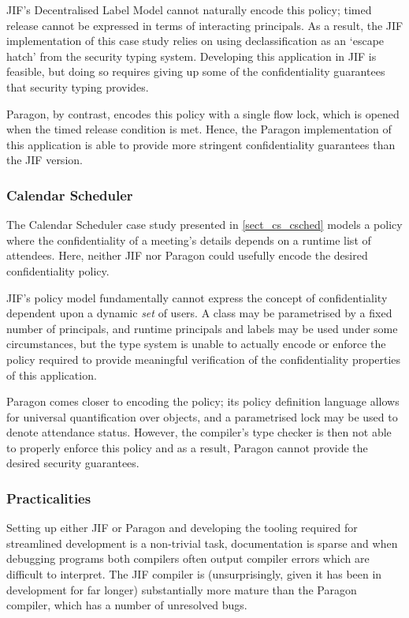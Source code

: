 JIF's Decentralised Label Model cannot naturally encode this policy; timed release cannot be expressed in terms of interacting principals. As a result, the JIF implementation of this case study relies on using declassification as an `escape hatch' from the security typing system. Developing this application in JIF is feasible, but doing so requires giving up some of the confidentiality guarantees that security typing provides.

Paragon, by contrast, encodes this policy with a single flow lock, which is opened when the timed release condition is met. Hence, the Paragon implementation of this application is able to provide more stringent confidentiality guarantees than the JIF version.

\subsubsection{Calendar Scheduler}

The Calendar Scheduler case study presented in \ref{sect_cs_csched} models a policy where the confidentiality of a meeting's details depends on a runtime list of attendees. Here, neither JIF nor Paragon could usefully encode the desired confidentiality policy.

JIF's policy model fundamentally cannot express the concept of confidentiality dependent upon a dynamic \textit{set} of users. A class may be parametrised by a fixed number of principals, and runtime principals and labels may be used under some circumstances, but the type system is unable to actually encode or enforce the policy required to provide meaningful verification of the confidentiality properties of this application.

Paragon comes closer to encoding the policy; its policy definition language allows for universal quantification over objects, and a parametrised lock may be used to denote attendance status. However, the compiler's type checker is then not able to properly enforce this policy and as a result, Paragon cannot provide the desired security guarantees.

\subsubsection{Practicalities}

Setting up either JIF or Paragon and developing the tooling required for streamlined development is a non-trivial task, documentation is sparse and when debugging programs both compilers often output compiler errors which are difficult to interpret. The JIF compiler is (unsurprisingly, given it has been in development for far longer) substantially more mature than the Paragon compiler, which has a number of unresolved bugs.

